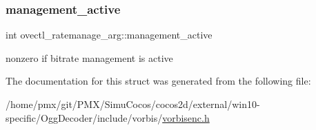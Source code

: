 \subsubsection{\texorpdfstring{management\+\_\+active}{management\_active}}
{\footnotesize\ttfamily int ovectl\+\_\+ratemanage\+\_\+arg\+::management\+\_\+active}

nonzero if bitrate management is active 

The documentation for this struct was generated from the following file\+:\begin{DoxyCompactItemize}
\item 
/home/pmx/git/\+P\+M\+X/\+Simu\+Cocos/cocos2d/external/win10-\/specific/\+Ogg\+Decoder/include/vorbis/\hyperlink{cocos2d_2external_2win10-specific_2OggDecoder_2include_2vorbis_2vorbisenc_8h}{vorbisenc.\+h}\end{DoxyCompactItemize}
